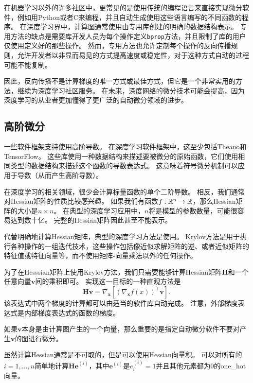 在机器学习以外的许多社区中，更常见的是使用传统的编程语言来直接实现微分软件，例如用Python或者C来编程，并且自动生成使用这些语言编写的不同函数的程序。
在深度学习界中，计算图通常使用由专用库创建的明确的数据结构表示。
专用方法的缺点是需要库开发人员为每个操作定义\verb|bprop|方法，并且限制了库的用户仅使用定义好的那些操作。
然而，专用方法也允许定制每个操作的反向传播规则，允许开发者以非显而易见的方式提高速度或稳定性，对于这种方式自动的过程可能不能复制。

因此，反向传播不是计算梯度的唯一方式或最佳方式，但它是一个非常实用的方法，继续为深度学习社区服务。 
在未来，深度网络的微分技术可能会提高，因为深度学习的从业者更加懂得了更广泛的自动微分领域的进步。
  
  
\subsection{高阶微分}
\label{sec:higher_order_derivatives}

一些软件框架支持使用高阶导数。 
在深度学习软件框架中，这至少包括Theano和TensorFlow。
这些库使用一种数据结构来描述要被微分的原始函数，它们使用相同类型的数据结构来描述这个函数的导数表达式。
这意味着符号微分机制可以应用于导数（从而产生高阶导数）。

在深度学习的相关领域，很少会计算标量函数的单个二阶导数。
相反，我们通常对Hessian矩阵的性质比较感兴趣。
如果我们有函数$f:\mathbb{R}^n \to \mathbb{R}$，那么Hessian矩阵的大小是$n\times n$。
在典型的深度学习应用中，$n$将是模型的参数数量，可能很容易达到数十亿。
完整的Hessian矩阵因此甚至不能表示。

代替明确地计算Hessian矩阵，典型的深度学习方法是使用。
Krylov方法是用于执行各种操作的一组迭代技术，这些操作包括像近似求解矩阵的逆、或者近似矩阵的特征值或特征向量等，而不使用矩阵-向量乘法以外的任何操作。

为了在Hesssian矩阵上使用Krylov方法，我们只需要能够计算Hessian矩阵$\bm{H}$和一个任意向量$\bm{v}$间的乘积即可。
实现这一目标的一种直观方法\citep{christianson1992automatic}是
\begin{equation}
  \bm{Hv}=\nabla_{\bm{x}} \left [ (\nabla_{\bm{x}} f(x))^\top \bm{v}\right ].
\end{equation}
该表达式中两个梯度的计算都可以由适当的软件库自动完成。
注意，外部梯度表达式是内部梯度表达式的函数的梯度。

如果$\bm{v}$本身是由计算图产生的一个向量，那么重要的是指定自动微分软件不要对产生$\bm{v}$的图进行微分。

虽然计算Hessian通常是不可取的，但是可以使用Hessian向量积。
可以对所有的$i=1,\ldots,n$简单地计算$\bm{He}^{(i)}$，其中$\bm{e}^{(i)}$是$e_i^{(i)}=1$并且其他元素都为0的\gls{one_hot}向量。

